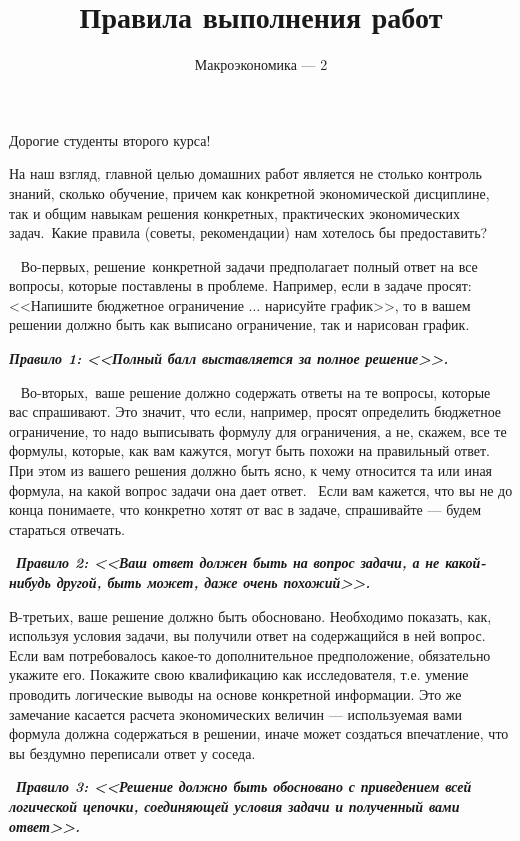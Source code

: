 \documentclass[a4paper,12pt]{article}
\author{Макроэкономика --- 2}
\title{Правила выполнения работ}
\date{}
\theoremstyle{plain} %
\theoremstyle{definition} %
\theoremstyle{remark} %
\begin{document}

\maketitle



Дорогие студенты второго курса!


На наш взгляд, главной целью домашних работ является не столько контроль знаний, сколько обучение, причем как конкретной экономической дисциплине, так и общим навыкам решения конкретных, практических экономических задач. Какие правила (советы, рекомендации) нам хотелось бы предоставить?

 
Во-первых, решение конкретной задачи предполагает полный ответ на все вопросы, которые поставлены в проблеме. Например, если в задаче просят: <<Напишите бюджетное ограничение $\dots$ нарисуйте график>>, то в вашем решении должно быть как выписано ограничение, так и нарисован график. 

\textbf{\textit{Правило 1: <<Полный балл выставляется за полное решение>>. 
}}  

 
Во-вторых, ваше решение должно содержать ответы на те вопросы, которые вас спрашивают. Это значит, что если, например, просят определить бюджетное ограничение, то надо выписывать формулу для ограничения, а не, скажем, все те формулы, которые, как вам кажутся, могут быть похожи на правильный ответ. При этом из вашего решения должно быть ясно, к чему относится та или иная формула, на какой вопрос задачи она дает ответ.  Если вам кажется, что вы не до конца понимаете, что конкретно хотят от вас в задаче, спрашивайте --- будем стараться отвечать.

 \textbf{\textit{Правило 2: <<Ваш ответ должен быть на вопрос задачи, а не какой-нибудь другой, быть может, даже очень похожий>>.
}}  



В-третьих, ваше решение должно быть обосновано. Необходимо показать, как, используя условия задачи, вы получили ответ на содержащийся в ней вопрос. Если вам потребовалось какое-то дополнительное предположение, обязательно укажите его.  Покажите свою квалификацию как исследователя, т.е. умение проводить логические выводы на основе конкретной информации. Это же замечание касается расчета экономических величин --- используемая вами формула должна содержаться в решении, иначе может создаться впечатление, что вы бездумно переписали ответ у соседа.

 \textbf{\textit{Правило 3: <<Решение должно быть обосновано с приведением всей логической цепочки, соединяющей условия задачи и полученный вами ответ>>.
}} 
\end{document}
